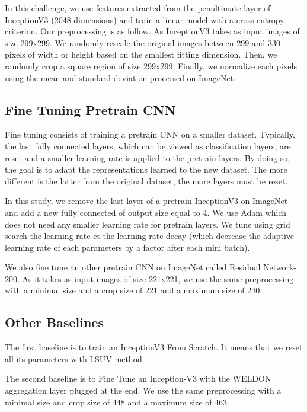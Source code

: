 \documentclass[10pt,twocolumn,letterpaper]{article}
\begin{document}
In this challenge, we use features extracted from the penultimate layer of InceptionV3 \cite{szegedy2015rethinking} (2048 dimensions) and train a linear model with a cross entropy criterion. Our preprocessing is as follow. As InceptionV3 takes as input images of size 299x299. We randomly rescale the original images between 299 and 330 pixels of width or height based on the smallest fitting dimension. Then, we randomly crop a square region of size 299x299. Finally, we normalize each pixels using the mean and standard deviation processed on ImageNet.


\subsection{Fine Tuning Pretrain CNN}

Fine tuning consists of training a pretrain CNN on a smaller dataset. Typically, the last fully connected layers, which can be viewed as classification layers, are reset and a smaller learning rate is applied to the pretrain layers. By doing so, the goal is to adapt the representations learned to the new dataset. The more different is the latter from the original dataset, the more layers must be reset.

In this study, we remove the last layer of a pretrain InceptionV3 on ImageNet and add a new fully connected of output size equal to 4. We use Adam \cite{Kingma14} which does not need any smaller learning rate for pretrain layers. We tune using grid search the learning rate et the learning rate decay (which decrease the adaptive learning rate of each parameters by a factor after each mini batch).

We also fine tune an other pretrain CNN on ImageNet called Residual Network-200. As it takes as input images of size 221x221, we use the same preprocessing with a minimal size and a crop size of 221 and a maximum size of 240.


\subsection{Other Baselines}

The first baseline is to train an InceptionV3 From Scratch. It means that we reset all its parameters with LSUV method %

The second baseline is to Fine Tune an Inception-V3 with the WELDON aggregation layer plugged at the end. %
We use the same preprocessing with a minimal size and crop size of 448 and a maximum size of 463.
\end{document}
